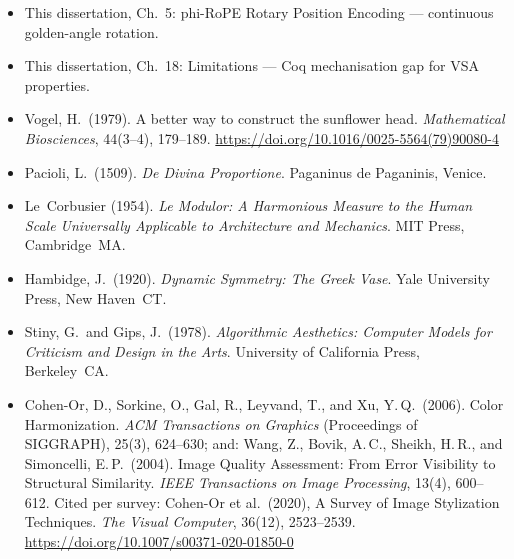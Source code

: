 \begin{itemize}
\item[\lbrack11\rbrack] This dissertation, Ch.~5:
  phi-RoPE Rotary Position Encoding ---
  continuous golden-angle rotation.

\item[\lbrack12\rbrack] This dissertation, Ch.~18:
  Limitations --- Coq mechanisation gap for VSA
  properties.

\item[\lbrack13\rbrack] Vogel, H.\ (1979).
  A better way to construct the sunflower head.
  \emph{Mathematical Biosciences}, 44(3--4),
  179--189.
  \url{https://doi.org/10.1016/0025-5564(79)90080-4}

\item[\lbrack14\rbrack] Pacioli, L.\ (1509).
  \emph{De Divina Proportione}.
  Paganinus de Paganinis, Venice.
  \cite{pacioli_divina}

\item[\lbrack15\rbrack] Le~Corbusier (1954).
  \emph{Le Modulor: A Harmonious Measure to the
  Human Scale Universally Applicable to
  Architecture and Mechanics}.
  MIT Press, Cambridge~MA.
  \cite{lecorbusier_modulor}

\item[\lbrack16\rbrack] Hambidge, J.\ (1920).
  \emph{Dynamic Symmetry: The Greek Vase}.
  Yale University Press, New Haven~CT.
  \cite{hambidge_dynamic_symmetry}

\item[\lbrack17\rbrack] Stiny, G.\ and
  Gips, J.\ (1978).
  \emph{Algorithmic Aesthetics: Computer Models
  for Criticism and Design in the Arts}.
  University of California Press, Berkeley~CA.
  \cite{stiny_algorithmic_aesthetics}

\item[\lbrack18\rbrack] Cohen-Or, D.,
  Sorkine, O., Gal, R., Leyvand, T.,
  and Xu, Y.\,Q.\ (2006).
  Color Harmonization.
  \emph{ACM Transactions on Graphics}
  (Proceedings of SIGGRAPH), 25(3), 624--630;
  and: Wang, Z., Bovik, A.\,C., Sheikh, H.\,R.,
  and Simoncelli, E.\,P.\ (2004). Image Quality
  Assessment: From Error Visibility to Structural
  Similarity. \emph{IEEE Transactions on Image
  Processing}, 13(4), 600--612.
  Cited per survey: Cohen-Or et al.\ (2020),
  A Survey of Image Stylization Techniques.
  \emph{The Visual Computer}, 36(12), 2523--2539.
  \url{https://doi.org/10.1007/s00371-020-01850-0}
  \cite{cohenor_stylization}

\end{itemize}


